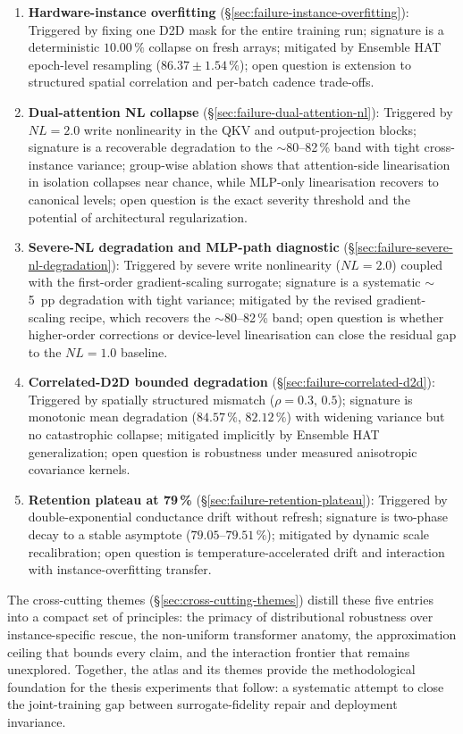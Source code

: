 \begin{enumerate}
    \item \textbf{Hardware-instance overfitting} (\S\ref{sec:failure-instance-overfitting}): Triggered by fixing one D2D mask for the entire training run; signature is a deterministic $10.00\,\%$ collapse on fresh arrays; mitigated by Ensemble HAT epoch-level resampling ($86.37\pm1.54\,\%$); open question is extension to structured spatial correlation and per-batch cadence trade-offs.
    \item \textbf{Dual-attention NL collapse} (\S\ref{sec:failure-dual-attention-nl}): Triggered by $NL=2.0$ write nonlinearity in the QKV and output-projection blocks; signature is a recoverable degradation to the $\sim$80--82\,\% band with tight cross-instance variance; group-wise ablation shows that attention-side linearisation in isolation collapses near chance, while MLP-only linearisation recovers to canonical levels; open question is the exact severity threshold and the potential of architectural regularization.
    \item \textbf{Severe-NL degradation and MLP-path diagnostic} (\S\ref{sec:failure-severe-nl-degradation}): Triggered by severe write nonlinearity ($NL=2.0$) coupled with the first-order gradient-scaling surrogate; signature is a systematic $\sim$5~pp degradation with tight variance; mitigated by the revised gradient-scaling recipe, which recovers the $\sim$80--82\,\% band; open question is whether higher-order corrections or device-level linearisation can close the residual gap to the $NL=1.0$ baseline.
    \item \textbf{Correlated-D2D bounded degradation} (\S\ref{sec:failure-correlated-d2d}): Triggered by spatially structured mismatch ($\rho=0.3$, $0.5$); signature is monotonic mean degradation ($84.57\,\%$, $82.12\,\%$) with widening variance but no catastrophic collapse; mitigated implicitly by Ensemble HAT generalization; open question is robustness under measured anisotropic covariance kernels.
    \item \textbf{Retention plateau at 79\,\%} (\S\ref{sec:failure-retention-plateau}): Triggered by double-exponential conductance drift without refresh; signature is two-phase decay to a stable asymptote ($79.05$--$79.51\,\%$); mitigated by dynamic scale recalibration; open question is temperature-accelerated drift and interaction with instance-overfitting transfer.
\end{enumerate}

The cross-cutting themes (\S\ref{sec:cross-cutting-themes}) distill these five entries into a compact set of principles: the primacy of distributional robustness over instance-specific rescue, the non-uniform transformer anatomy, the approximation ceiling that bounds every claim, and the interaction frontier that remains unexplored.  Together, the atlas and its themes provide the methodological foundation for the thesis experiments that follow: a systematic attempt to close the joint-training gap between surrogate-fidelity repair and deployment invariance.
